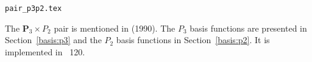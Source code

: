 \begin{flushright} {\tiny {\color{gray} \tt pair\_p3p2.tex}} \end{flushright}

The ${\bm P}_3\times P_2$ pair is mentioned in \textcite{sten90} (1990).
The $P_3$ basis functions are presented in Section~\ref{basis:p3} and the $P_2$ basis
functions in Section~\ref{basis:p2}.
It is implemented in \stone~120.
